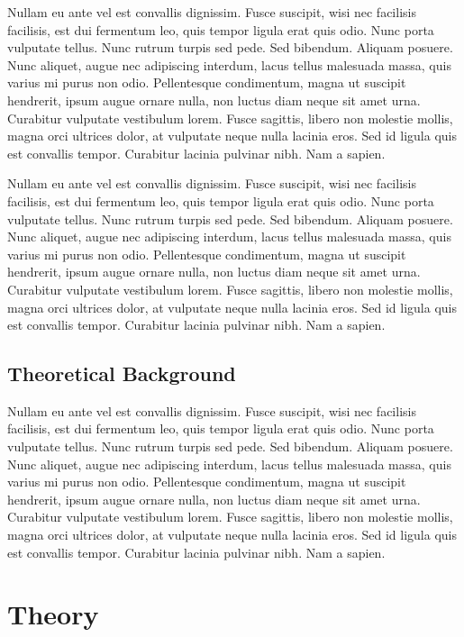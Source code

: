 \documentclass[a4paper,12pt,oneside,print,numbered,index,PageStyleIII]{PhDThesisPSnPDF}
\begin{document}
Nullam eu ante vel est convallis dignissim.  Fusce suscipit, wisi nec facilisis facilisis, est dui fermentum leo, quis tempor ligula erat quis odio.  Nunc porta vulputate tellus.  Nunc rutrum turpis sed pede.  Sed bibendum.  Aliquam posuere.  Nunc aliquet, augue nec adipiscing interdum, lacus tellus malesuada massa, quis varius mi purus non odio.  Pellentesque condimentum, magna ut suscipit hendrerit, ipsum augue ornare nulla, non luctus diam neque sit amet urna.  Curabitur vulputate vestibulum lorem.  Fusce sagittis, libero non molestie mollis, magna orci ultrices dolor, at vulputate neque nulla lacinia eros.  Sed id ligula quis est convallis tempor.  Curabitur lacinia pulvinar nibh.  Nam a sapien.

Nullam eu ante vel est convallis dignissim.  Fusce suscipit, wisi nec facilisis facilisis, est dui fermentum leo, quis tempor ligula erat quis odio.  Nunc porta vulputate tellus.  Nunc rutrum turpis sed pede.  Sed bibendum.  Aliquam posuere.  Nunc aliquet, augue nec adipiscing interdum, lacus tellus malesuada massa, quis varius mi purus non odio.  Pellentesque condimentum, magna ut suscipit hendrerit, ipsum augue ornare nulla, non luctus diam neque sit amet urna.  Curabitur vulputate vestibulum lorem.  Fusce sagittis, libero non molestie mollis, magna orci ultrices dolor, at vulputate neque nulla lacinia eros.  Sed id ligula quis est convallis tempor.  Curabitur lacinia pulvinar nibh.  Nam a sapien.

\section{Theoretical Background}
\label{sec:org2c23545}

Nullam eu ante vel est convallis dignissim.  Fusce suscipit, wisi nec facilisis facilisis, est dui fermentum leo, quis tempor ligula erat quis odio.  Nunc porta vulputate tellus.  Nunc rutrum turpis sed pede.  Sed bibendum.  Aliquam posuere.  Nunc aliquet, augue nec adipiscing interdum, lacus tellus malesuada massa, quis varius mi purus non odio.  Pellentesque condimentum, magna ut suscipit hendrerit, ipsum augue ornare nulla, non luctus diam neque sit amet urna.  Curabitur vulputate vestibulum lorem.  Fusce sagittis, libero non molestie mollis, magna orci ultrices dolor, at vulputate neque nulla lacinia eros.  Sed id ligula quis est convallis tempor.  Curabitur lacinia pulvinar nibh.  Nam a sapien.


\chapter{Theory}
\label{sec:org4766bac}
\label{chapter:theory}
\end{document}
